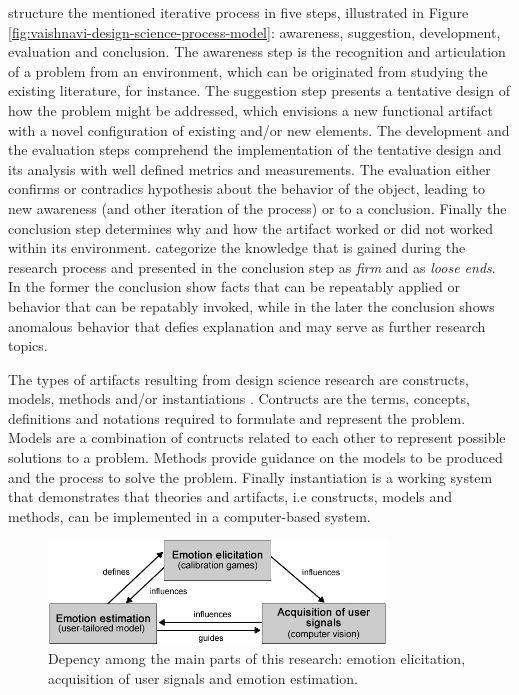 \textcite{vaishnavi2004design} structure the mentioned iterative process in five steps, illustrated in Figure \ref{fig:vaishnavi-design-science-process-model}: awareness, suggestion, development, evaluation and conclusion. The awareness step is the recognition and articulation of a problem from an environment, which can be originated from studying the existing literature, for instance. The suggestion step presents a tentative design of how the problem might be addressed, which envisions a new functional artifact with a novel configuration of existing and/or new elements. The development and the evaluation steps comprehend the implementation of the tentative design and its analysis with well defined metrics and measurements. The evaluation either confirms or contradics hypothesis about the behavior of the object, leading to new awareness (and other iteration of the process) or to a conclusion. Finally the conclusion step determines why and how the artifact worked or did not worked within its environment. \textcite{vaishnavi2004design} categorize the knowledge that is gained during the research process and presented in the conclusion step as \textit{firm} and as \textit{loose ends}. In the former the conclusion show facts that can be repeatably applied or behavior that can be repatably invoked, while in the later the conclusion shows anomalous behavior that defies explanation and may serve as further research topics.

The types of artifacts resulting from design science research are constructs, models, methods and/or instantiations \parencite{oates2005researching,johannesson2014introduction}. Contructs are the terms, concepts, definitions and notations required to formulate and represent the problem. Models are a combination of contructs related to each other to represent possible solutions to a problem. Methods provide guidance on the models to be produced and the process to solve the problem. Finally instantiation is a working system that demonstrates that theories and artifacts, i.e constructs, models and methods, can be implemented in a computer-based system.

\begin{figure}[h]
    \centering
    \includegraphics[width=0.8\textwidth]{figures/method-components-dependency.png}
    \caption{Depency among the main parts of this research: emotion elicitation, acquisition of user signals and emotion estimation.}
    \label{fig:method-components-dependency}
\end{figure}

